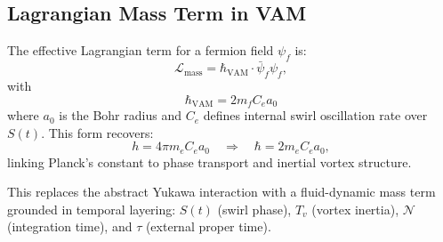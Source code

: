 \subsection{Lagrangian Mass Term in VAM}

The effective Lagrangian term for a fermion field $\psi_f$ is:
\begin{equation}
    \mathcal{L}_\text{mass} = \hbar_{\text{VAM}} \cdot \bar{\psi}_f \psi_f,
\end{equation}
with
\begin{equation}
    \boxed{ \hbar_{\text{VAM}} = 2 m_f C_e a_0 }
\end{equation}
where $a_0$ is the Bohr radius and $C_e$ defines internal swirl oscillation rate over $S(t)$. This form recovers:
\[
    h = 4\pi m_e C_e a_0 \quad \Rightarrow \quad \hbar = 2 m_e C_e a_0,
\]
linking Planck's constant to phase transport and inertial vortex structure.

This replaces the abstract Yukawa interaction with a fluid-dynamic mass term grounded in temporal layering: $S(t)$ (swirl phase), $T_v$ (vortex inertia), $\mathcal{N}$ (integration time), and $\tau$ (external proper time).
